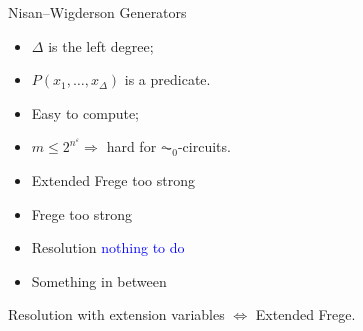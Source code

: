 \begin{frame}{Nisan--Wigderson Generators}

    \begin{minipage}{0.48\linewidth}
        \centering
        
    \end{minipage}
    \begin{minipage}{0.48\linewidth}
        \begin{itemize}
            \item $\Delta$ is the left degree;
            \item $P(x_1, \dots, x_{\Delta})$ is a predicate.
        \end{itemize}
        
        \vspace{0.2cm}
        \pause
        \begin{itemize}
            \item Easy to compute;
            \item $m \le 2^{n^{\varepsilon}} \Rightarrow$ hard for $\AC_0$-circuits.
        \end{itemize}
    \end{minipage}

    \pause
    \vspace{0.3cm}
    \begin{minipage}{0.38\linewidth}
        \begin{itemize}
            \item Extended Frege \pause \alert{too strong}
                \pause
            \item Frege \pause \alert{too strong}
                \pause
            \item Resolution \pause \textcolor{blue}{nothing to do}
                \pause
            \item Something in between
        \end{itemize}
    \end{minipage}
    \pause
    \begin{minipage}{0.56\linewidth}
        \begin{lemma}
            Resolution with extension variables $\Leftrightarrow$ Extended Frege.
        \end{lemma}
    \end{minipage}
\end{frame}


